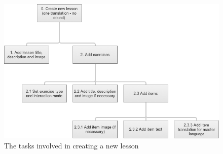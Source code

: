 
\begin{figure}[h]
 \centering
 \includegraphics[width=\textwidth]{images/task-analysis/create_lesson}
 \caption{The tasks involved in creating a new lesson}
 \label{fig:build}
\end{figure}



